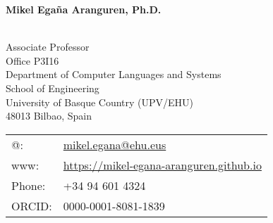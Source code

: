 \documentclass[11pt,fullpage]{article}
\newcommand{\etc}{\emph{etc.}}
\def\name{Mikel Ega\~na Aranguren, Ph.D.}
\begin{document}


\centerline{\Large \bf \name}

\vspace{0.25in}

\begin{minipage}{0.50\linewidth}
~\\
Associate Professor \\




  Office P3I16 \\ 
  Department of Computer Languages and Systems \\
  School of Engineering \\
  University of Basque Country (UPV/EHU) \\
  48013 Bilbao, Spain \\


\end{minipage}
\begin{minipage}{0.50\linewidth}
  \begin{tabular}{ll}
    @: 
& \href{mailto:mikel.egana@ehu.eus}{mikel.egana@ehu.eus} \\
    www: & \href{https://mikel-egana-aranguren.github.io}{https://mikel-egana-aranguren.github.io} \\
    Phone: & +34 94 601 4324 \\
    ORCID: & 0000-0001-8081-1839 \\

  \end{tabular}
\end{minipage}


\end{document}
